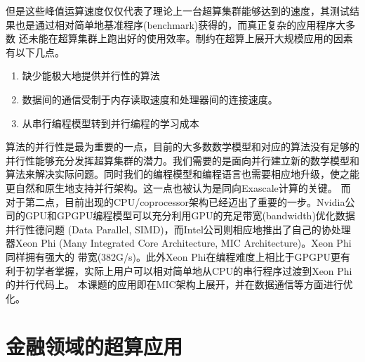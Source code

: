 但是这些峰值运算速度仅仅代表了理论上一台超算集群能够达到的速度，其测试结果也是通过相对简单地基准程序(benchmark)获得的，而真正复杂的应用程序大多数
还未能在超算集群上跑出好的使用效率。制约在超算上展开大规模应用的因素有以下几点。
\begin{enumerate}
    \item 缺少能极大地提供并行性的算法
	\item 数据间的通信受制于内存读取速度和处理器间的连接速度。
	\item 从串行编程模型转到并行编程的学习成本
\end{enumerate}
算法的并行性是最为重要的一点，目前的大多数数学模型和对应的算法没有足够的并行性能够充分发挥超算集群的潜力。我们需要的是面向并行建立新的数学模型和
算法来解决实际问题。同时我们的编程模型和编程语言也需要相应地升级，使之能更自然和原生地支持并行架构。这一点也被认为是同向Exascale计算的关键。
而对于第二点，目前出现的CPU/coprocessor架构已经迈出了重要的一步。Nvidia公司的GPU和GPGPU编程模型可以充分利用GPU的充足带宽(bandwidth)优化数据并行性德问题
(Data Parallel, SIMD)，而Intel公司则相应地推出了自己的协处理器Xeon Phi (Many Integrated Core Architecture, MIC Architecture)。Xeon Phi同样拥有强大的
带宽(382G/s)。此外Xeon Phi在编程难度上相比于GPGPU更有利于初学者掌握，实际上用户可以相对简单地从CPU的串行程序过渡到Xeon Phi的并行代码上。
本课题的应用即在MIC架构上展开，并在数据通信等方面进行优化。


\section{金融领域的超算应用} %
\label{sec:intro-finance}





